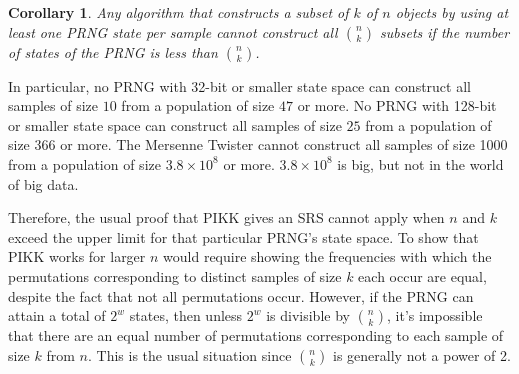 \documentclass[12pt]{article}
\newtheorem{corollary}[theorem]{Corollary}
\newcommand{\todo}[1]{{\color{red}{TO DO: \sc #1}}}
\begin{document}
%






\begin{corollary}
Any algorithm that constructs a subset of $k$ of $n$ objects by using at least one PRNG state per sample cannot construct all $n \choose k$ subsets if the number of states of the PRNG is less than $n \choose k$.
\end{corollary}

In particular, no PRNG with 32-bit or smaller state space can construct all samples of size $10$ from a population of size $47$ or more. 
No PRNG with 128-bit or smaller state space can construct all samples of size $25$ from a population of size $366$ or more. 
The Mersenne Twister cannot construct all samples of size 1000 from a population of size $3.8 \times 10^8$ or more.
$3.8 \times 10^8$ is big, but not in the world of big data.

%
%
%

Therefore, the usual proof that PIKK gives an SRS cannot apply when $n$ and $k$ exceed the upper limit for that particular PRNG's state space.
To show that PIKK works for larger $n$ would require showing the frequencies with which the permutations corresponding to distinct samples of size $k$ each occur are equal, despite the fact that not all permutations occur.
However, if the PRNG can attain a total of $2^w$ states, then unless $2^w$ is divisible by ${n \choose k}$, it's impossible that there are an equal number of permutations corresponding to each sample of size $k$ from $n$. 
This is the usual situation since ${n \choose k }$ is generally not a power of 2.
\end{document}

